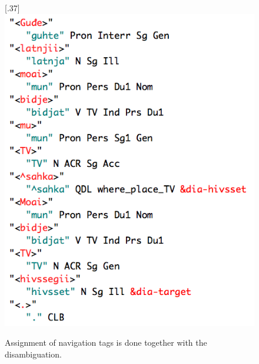\documentclass[11pt]{article}
\begin{document}
\begin{figure}[htbp]
\begin{center}
\scalebox{.37}[.37]{\includegraphics{presentation/img/hivssegiiCGanalEng.png}}\\
\caption{Assignment of navigation tags is done together with the disambiguation.}
\label{hivssetanalysis}
\end{center}
\end{figure}

\end{document}
